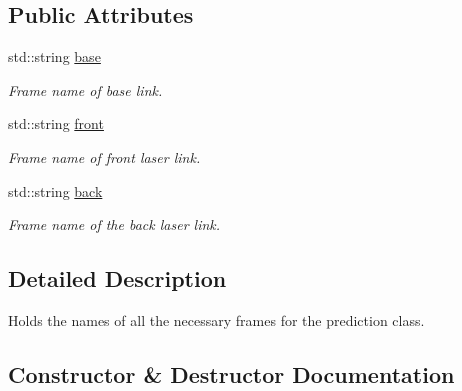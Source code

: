 \subsection*{Public Attributes}
\begin{DoxyCompactItemize}
\item 
std\+::string \hyperlink{structLaserPredictor_1_1Frames_a279efa689fc1b142d95055b8d85b0b3e}{base}\hypertarget{structLaserPredictor_1_1Frames_a279efa689fc1b142d95055b8d85b0b3e}{}\label{structLaserPredictor_1_1Frames_a279efa689fc1b142d95055b8d85b0b3e}

\begin{DoxyCompactList}\small\item\em Frame name of base link. \end{DoxyCompactList}\item 
std\+::string \hyperlink{structLaserPredictor_1_1Frames_a204e91ead9b16ec6562746d13eb4828a}{front}\hypertarget{structLaserPredictor_1_1Frames_a204e91ead9b16ec6562746d13eb4828a}{}\label{structLaserPredictor_1_1Frames_a204e91ead9b16ec6562746d13eb4828a}

\begin{DoxyCompactList}\small\item\em Frame name of front laser link. \end{DoxyCompactList}\item 
std\+::string \hyperlink{structLaserPredictor_1_1Frames_a28b95577e6a88d8211ddaa9f99fb90f4}{back}\hypertarget{structLaserPredictor_1_1Frames_a28b95577e6a88d8211ddaa9f99fb90f4}{}\label{structLaserPredictor_1_1Frames_a28b95577e6a88d8211ddaa9f99fb90f4}

\begin{DoxyCompactList}\small\item\em Frame name of the back laser link. \end{DoxyCompactList}\end{DoxyCompactItemize}


\subsection{Detailed Description}
Holds the names of all the necessary frames for the prediction class. 

\subsection{Constructor \& Destructor Documentation}
